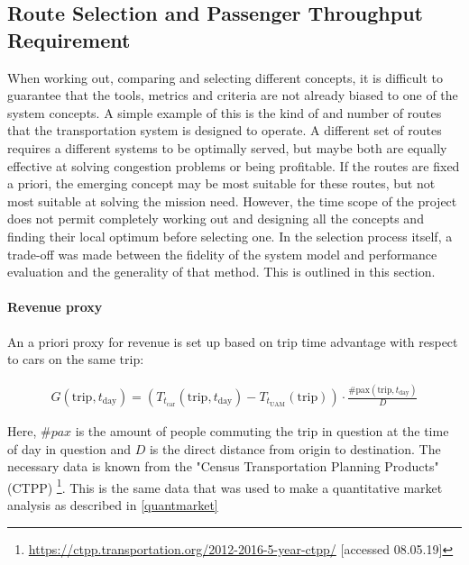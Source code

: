 \subsection{Route Selection and Passenger Throughput Requirement} \label{subsec:routeselection}

When working out, comparing and selecting different concepts, it is difficult to guarantee that the tools, metrics and criteria are not already biased to one of the system concepts. A simple example of this is the kind of and number of routes that the transportation system is designed to operate. A different set of routes requires a different systems to be optimally served, but maybe both are equally effective at solving congestion problems or being profitable. If the routes are fixed a priori, the emerging concept may be most suitable for these routes, but not most suitable at solving the mission need. However, the time scope of the project does not permit completely working out and designing all the concepts and finding their local optimum before selecting one. In the selection process itself, a trade-off was made between the fidelity of the system model and performance evaluation and the generality of that method. This is outlined in this section.


\paragraph{Revenue proxy}

An a priori proxy for revenue is set up based on trip time advantage with respect to cars on the same trip:

\begin{align} \label{eq:gainmetric}
    G(\text{trip}, t_\text{day}) = \left( T_{t_\text{car}}(\text{trip}, t_\text{day}) - T_{{t}_\text{UAM}}(\text{trip}) \right) \cdot \frac{\#\text{pax}(\text{trip},t_\text{day})}{D}
\end{align}

Here, $\#pax$ is the amount of people commuting the trip in question at the time of day in question and $D$ is the direct distance from origin to destination. The necessary data is known from the "Census Transportation Planning Products" (CTPP) \footnote{\url{https://ctpp.transportation.org/2012-2016-5-year-ctpp/} [accessed 08.05.19]}. This is the same data that was used to make a quantitative market analysis as described in \autoref{quantmarket}

